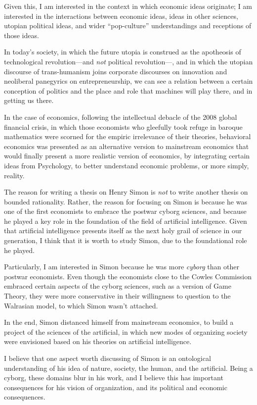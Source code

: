 \documentclass[paper=B6,portrait,twoside=true,twocolumn=false,headinclude=true,footinclude=false,fontsize=12,BCOR=10mm,DIV=calc,pagesize=auto,titlepage=firstiscover,mpinclude=false,headings=normal,headings=twolinechapter,open=right,toc=graduated,chapterprefix=false,numbers=endperiod,parskip=half+]{scrbook}
\theoremstyle{definition}
\begin{document}
Given this, I am interested in the context in which economic ideas
originate; I am interested in the interactions between economic ideas,
ideas in other sciences, utopian political ideas, and wider ``pop-culture''
understandings and receptions of those ideas.

In today's society, in which the future utopia is construed as the
apotheosis of technological revolution---and \emph{not} political revolution---,
and in which the utopian discourse of trans-humanism joins corporate
discourses on innovation and neoliberal panegyrics on entrepreneurship, we
can see a relation between a certain conception of politics and the place
and role that machines will play there, and in getting us there.

In the case of economics, following the intellectual debacle of the 2008
global financial crisis, in which those economists who gleefully took 
refuge in baroque mathematics were scorned for the empiric irrelevance of
their theories, behavioral economics was presented as an alternative
version to mainstream economics that would finally present a more realistic
version of economics, by integrating certain ideas from Psychology, to
better understand economic problems, or more simply, reality.  

The reason for writing a thesis on Henry Simon is \emph{not} to write another
thesis on bounded rationality. Rather, the reason for focusing on Simon is
because he was one of the first economists to embrace the postwar cyborg
sciences, and because he played a key role in the foundation of the field
of artificial intelligence. Given that artificial intelligence presents
itself as the next holy grail of science in our generation, I think that it
is worth to study Simon, due to the foundational role he played.

Particularly, I am interested in Simon because he was more \emph{cyborg} than
other postwar economists. Even though the economists close to the Cowles
Commission embraced certain aspects of the cyborg sciences, such as a
version of Game Theory, they were more conservative in their willingness to
question to the Walrasian model, to which Simon wasn't attached. 

In the end, Simon distanced himself from mainstream economics, to build a
project of the sciences of the artificial, in which new modes of organizing
society were envisioned based on his theories on artificial intelligence. 

I believe that one aspect worth discussing of Simon is an ontological
understanding of his idea of nature, society, the human, and the artificial. 
Being a cyborg, these domains blur in his work, and I believe this has
important consequences for his vision of organization, and its political
and economic consequences. 
\end{document}
